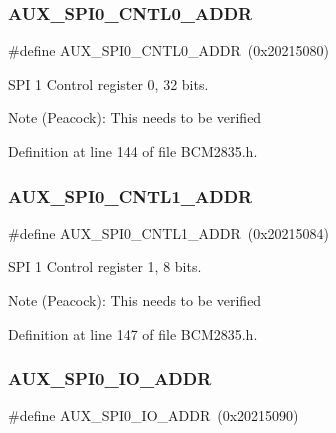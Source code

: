 \subsubsection{\texorpdfstring{A\+U\+X\+\_\+\+S\+P\+I0\+\_\+\+C\+N\+T\+L0\+\_\+\+A\+D\+DR}{AUX\_SPI0\_CNTL0\_ADDR}}
{\footnotesize\ttfamily \#define A\+U\+X\+\_\+\+S\+P\+I0\+\_\+\+C\+N\+T\+L0\+\_\+\+A\+D\+DR~(0x20215080)}



S\+PI 1 Control register 0, 32 bits. 

\begin{DoxyNote}{Note}
(Peacock)\+: This needs to be verified 
\end{DoxyNote}


Definition at line 144 of file B\+C\+M2835.\+h.

\mbox{\label{group__SPI_gaa4cdf59ae699e8e598ac84dc6f98e65e}} 
\subsubsection{\texorpdfstring{A\+U\+X\+\_\+\+S\+P\+I0\+\_\+\+C\+N\+T\+L1\+\_\+\+A\+D\+DR}{AUX\_SPI0\_CNTL1\_ADDR}}
{\footnotesize\ttfamily \#define A\+U\+X\+\_\+\+S\+P\+I0\+\_\+\+C\+N\+T\+L1\+\_\+\+A\+D\+DR~(0x20215084)}



S\+PI 1 Control register 1, 8 bits. 

\begin{DoxyNote}{Note}
(Peacock)\+: This needs to be verified 
\end{DoxyNote}


Definition at line 147 of file B\+C\+M2835.\+h.

\mbox{\label{group__SPI_ga9ffd1ea2cfa82c89ef664ce216453987}} 
\subsubsection{\texorpdfstring{A\+U\+X\+\_\+\+S\+P\+I0\+\_\+\+I\+O\+\_\+\+A\+D\+DR}{AUX\_SPI0\_IO\_ADDR}}
{\footnotesize\ttfamily \#define A\+U\+X\+\_\+\+S\+P\+I0\+\_\+\+I\+O\+\_\+\+A\+D\+DR~(0x20215090)}




